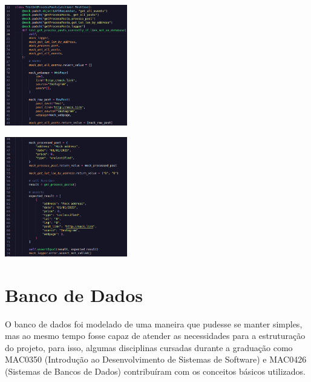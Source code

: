 \begin{multicols}{2}
    \centering
    \vspace*{\fill}
    \includegraphics[width=0.4\textwidth]{figuras/testeUnitario1.png}
    \vspace*{\fill}

    \vspace*{\fill}
    \includegraphics[width=0.4\textwidth]{figuras/testeUnitario2.png}
    \vspace*{\fill}


\end{multicols}

\section{Banco de Dados}

O banco de dados foi modelado de uma maneira que pudesse se manter simples, mas
ao mesmo tempo fosse capaz de atender as necessidades para a estruturação do
projeto, para isso, algumas disciplinas cursadas durante a graduação como
MAC0350 (Introdução ao Desenvolvimento de Sistemas de Software) e MAC0426
(Sistemas de Bancos de Dados) contribuíram com os conceitos básicos utilizados.

